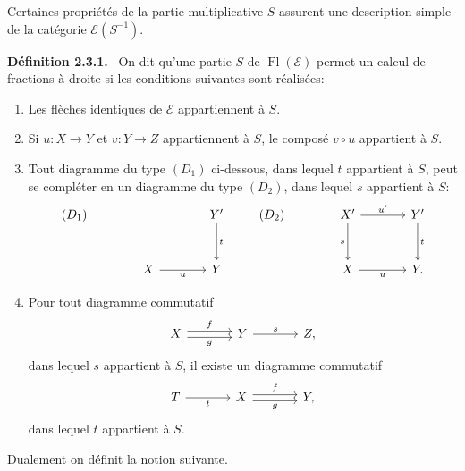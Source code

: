 \documentclass[11pt]{article}
\newenvironment{statement}[1]{\par\medskip\noindent\textbf{#1.}\ }{\par\medskip}
\providecommand{\Fl}{\operatorname{Fl}}
\providecommand{\cE}{\mathcal E}
\begin{document}
Certaines propriétés de la partie multiplicative $S$ assurent une description simple de la catégorie $\cE(S^{-1})$.

\begin{statement}{Définition 2.3.1}
On dit qu'une partie $S$ de $\Fl(\cE)$ permet un calcul de fractions à droite si les conditions suivantes sont réalisées:
\begin{enumerate}[label=(\alph*)]
\item Les flèches identiques de $\cE$ appartiennent à $S$.
\item Si $u:X\to Y$ et $v:Y\to Z$ appartiennent à $S$, le composé $v\circ u$ appartient à $S$.
\item Tout diagramme du type $(D_1)$ ci-dessous, dans lequel $t$ appartient à $S$, peut se compléter en un diagramme du type $(D_2)$, dans lequel $s$ appartient à $S$:
\[
\begin{tikzcd}[column sep=large,row sep=large]
(D_1)& & Y' \arrow[d,"t"]\\
& X \arrow[r,"u"'] & Y
\end{tikzcd}
\qquad
\begin{tikzcd}[column sep=large,row sep=large]
(D_2)& X' \arrow[r,"u'"] \arrow[d,"s"'] & Y' \arrow[d,"t"]\\
& X \arrow[r,"u"'] & Y .
\end{tikzcd}
\]
\item Pour tout diagramme commutatif
\[
\begin{tikzcd}[column sep=large]
X \arrow[r,shift left,"f"] \arrow[r,shift right,"g"'] & Y \arrow[r,"s"] & Z,
\end{tikzcd}
\]
dans lequel $s$ appartient à $S$, il existe un diagramme commutatif
\[
\begin{tikzcd}[column sep=large]
T \arrow[r,"t"'] & X \arrow[r,shift left,"f"] \arrow[r,shift right,"g"'] & Y,
\end{tikzcd}
\]
dans lequel $t$ appartient à $S$.
\end{enumerate}
\end{statement}

Dualement on définit la notion suivante.
\end{document}
